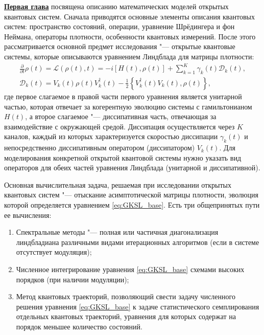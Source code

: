 \underline{\textbf{Первая глава}} посвящена описанию математических моделей открытых квантовых систем.
Сначала приводятся основные элементы описания квантовых систем: пространство состояний, операции, уравнение Шрёдингера и фон Неймана, операторы плотности, особенности квантовых измерений.
После этого рассматривается основной предмет исследования "--- открытые квантовые системы, которые описываются уравнением Линдблада для матрицы плотности:
\begin{equation}
	\label{eq:GKSL_base}
	\begin{gathered}
		\frac{\partial}{\partial t} \rho (t) = \mathcal{L}(\rho(t), t) = -i \left[ H(t), \rho(t) \right] + \sum_{k=1}^{K} \gamma_{k}(t) \mathcal{D}_k(t), \\
		\mathcal{D}_k(t) =  V_k(t) \rho(t) V_k^\dagger(t) - \frac{1}{2} \left\lbrace V_k^\dagger(t) V_k(t), \rho(t) \right\rbrace ,
	\end{gathered}
\end{equation}
где первое слагаемое в правой части первого уравнения является унитарной частью, которая отвечает за когерентную эволюцию системы с гамильтонианом \(H(t)\), а второе слагаемое "--- диссипативная часть, отвечающая за взаимодействие с окружающей средой. 
Диссипация осуществляется через \(K\) каналов, каждый из которых характеризуется скоростью диссипации \(\gamma_{k}(t)\) и непосредственно диссипативным оператором (диссипатором) \(V_k(t)\).  
Для моделирования конкретной открытой квантовой системы нужно указать вид операторов для обеих частей уравнения Линдблада (унитарной и диссипативной).

Основная вычислительная задача, решаемая при исследовании открытых квантовых систем "--- отыскание асимптотической матрицы плотности, эволюция которой определяется уравнением \cref{eq:GKSL_base}. 
Есть три общепринятых пути ее вычисления:
\begin{enumerate}[beginpenalty=10000] %
	\item Спектральные методы "--- полная или частичная диагонализация линдбладиана различными видами итерационных алгоритмов (если в системе отсутствует модуляция);
	\item Численное интегрирование уравнения \cref{eq:GKSL_base} схемами высоких порядков (при наличии модуляции);
	\item Метод квантовых траекторий, позволяющий свести задачу численного решения уравнения \cref{eq:GKSL_base} к задаче статистического семплирования отдельных квантовых траекторий, уравнения для которых содержат на порядок меньшее количество состояний.
\end{enumerate}

